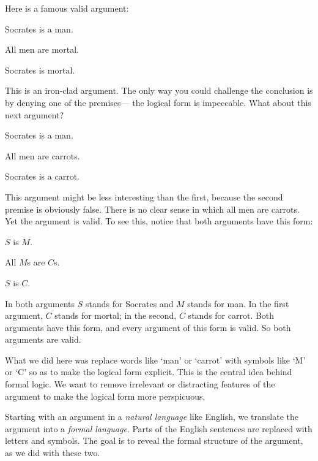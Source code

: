 Here is a famous valid argument:
\begin{earg}
\item[] Socrates is a man.
\item[] All men are mortal.
\item[\therefore] Socrates is mortal.
\end{earg}
This is an iron-clad argument. The only way you could challenge the conclusion is by denying one of the premises--- the logical form is impeccable. What about this next argument?

\begin{earg}
\item[] Socrates is a man.
\item[] All men are carrots.
\item[\therefore] Socrates is a carrot.
\end{earg}

This argument might be less interesting than the first, because the second premise is obviously false. There is no clear sense in which all men are carrots. Yet the argument is valid. To see this, notice that both arguments have this form:

\begin{earg}
\item[] $S$ is $M$.
\item[] All $M$s are $C$s.
\item[\therefore] $S$ is $C$.
\end{earg}

In both arguments $S$ stands for Socrates and $M$ stands for man. In the first argument, $C$ stands for mortal; in the second, $C$ stands for carrot. Both arguments have this form, and every argument of this form is valid. So both arguments are valid.


What we did here was replace words like `man' or `carrot' with symbols like `M' or `C' so as to make the logical form explicit. This is the central idea behind formal logic. We want to remove irrelevant or distracting features of the argument to make the logical form more perspicuous.

Starting with an argument in a \emph{natural language} like English, we translate the argument into a \emph{formal language}. Parts of the English sentences are replaced with letters and symbols. The goal is to reveal the formal structure of the argument, as we did with these two.


